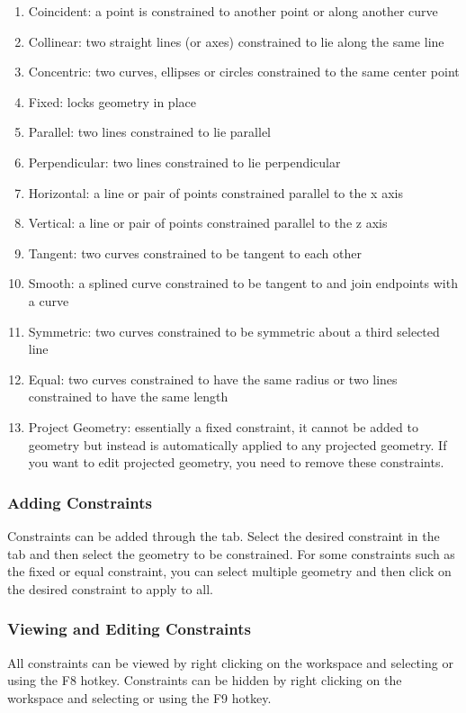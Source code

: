 \begin{enumerate}
\item Coincident: a point is constrained to another point or along another curve
\item Collinear: two straight lines (or axes) constrained to lie along the same line
\item Concentric: two curves, ellipses or circles constrained to the same center point
\item Fixed: locks geometry in place
\item Parallel: two lines constrained to lie parallel
\item Perpendicular: two lines constrained to lie perpendicular
\item Horizontal: a line or pair of points constrained parallel to the x axis
\item Vertical: a line or pair of points constrained parallel to the z axis
\item Tangent: two curves constrained to be tangent to each other
\item Smooth: a splined curve constrained to be tangent to and join endpoints with a curve
\item Symmetric: two curves constrained to be symmetric about a third selected line
\item Equal: two curves constrained to have the same radius or two lines constrained to have the same length
\item Project Geometry: essentially a fixed constraint, it cannot be added to geometry but instead is automatically applied to any projected geometry. If you want to edit projected geometry, you need to remove these constraints.
\end{enumerate}

\subsubsection{Adding Constraints}
Constraints can be added through the  tab. Select the desired constraint in the tab and then select the geometry to be constrained. For some constraints such as the fixed or equal constraint, you can select multiple geometry and then click on the desired constraint to apply to all.

\subsubsection{Viewing and Editing Constraints}
All constraints can be viewed by right clicking on the workspace and selecting  or using the F8 hotkey. Constraints can be hidden by right clicking on the workspace and selecting  or using the F9 hotkey.

